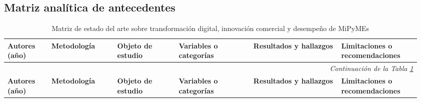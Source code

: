 \documentclass[spanish,letterpaper,oneside]{article}
\newcommand{\matrixheader}{%
\textbf{Autores (año)} & \textbf{Metodología} & \textbf{Objeto de estudio} &
\textbf{Variables o categorías} & \textbf{Resultados y hallazgos} &
\textbf{Limitaciones o recomendaciones} \\
\midrule}
\begin{document}
\subsection[Matriz de antecedentes]{Matriz analítica de antecedentes}

\clearpage
\pagestyle{empty}
\begin{landscape}
\begingroup
\fontsize{6.35}{7.45}\selectfont
\setlength{\tabcolsep}{2.2pt}
\renewcommand{\arraystretch}{1.14}
\begin{longtable}{@{}p{0.105\linewidth}p{0.155\linewidth}p{0.145\linewidth}p{0.17\linewidth}p{0.205\linewidth}p{0.18\linewidth}@{}}
\caption{Matriz de estado del arte sobre transformación digital, innovación comercial y desempeño de MiPyMEs}\label{tab:estado-arte}\\
\toprule
\matrixheader
\endfirsthead
\multicolumn{6}{r}{\textit{Continuación de la Tabla \ref{tab:estado-arte}}}\\
\toprule
\matrixheader
\endhead


\end{longtable}
\end{landscape}
\end{document}
